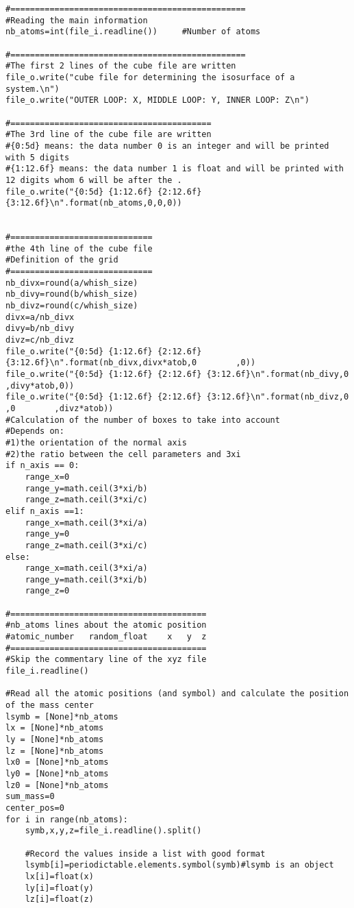 \begin{lstlisting}
#================================================
#Reading the main information
nb_atoms=int(file_i.readline())     #Number of atoms

#================================================
#The first 2 lines of the cube file are written
file_o.write("cube file for determining the isosurface of a system.\n")
file_o.write("OUTER LOOP: X, MIDDLE LOOP: Y, INNER LOOP: Z\n")

#=========================================
#The 3rd line of the cube file are written
#{0:5d} means: the data number 0 is an integer and will be printed with 5 digits
#{1:12.6f} means: the data number 1 is float and will be printed with 12 digits whom 6 will be after the .
file_o.write("{0:5d} {1:12.6f} {2:12.6f} {3:12.6f}\n".format(nb_atoms,0,0,0))


#=============================
#the 4th line of the cube file
#Definition of the grid
#=============================
nb_divx=round(a/whish_size) 
nb_divy=round(b/whish_size) 
nb_divz=round(c/whish_size) 
divx=a/nb_divx
divy=b/nb_divy
divz=c/nb_divz
file_o.write("{0:5d} {1:12.6f} {2:12.6f} {3:12.6f}\n".format(nb_divx,divx*atob,0        ,0))
file_o.write("{0:5d} {1:12.6f} {2:12.6f} {3:12.6f}\n".format(nb_divy,0        ,divy*atob,0))
file_o.write("{0:5d} {1:12.6f} {2:12.6f} {3:12.6f}\n".format(nb_divz,0        ,0        ,divz*atob))
#Calculation of the number of boxes to take into account
#Depends on:
#1)the orientation of the normal axis
#2)the ratio between the cell parameters and 3xi
if n_axis == 0:
	range_x=0
	range_y=math.ceil(3*xi/b)
	range_z=math.ceil(3*xi/c)
elif n_axis ==1:
	range_x=math.ceil(3*xi/a) 
	range_y=0
	range_z=math.ceil(3*xi/c)
else:
	range_x=math.ceil(3*xi/a)
	range_y=math.ceil(3*xi/b)
	range_z=0
	
#========================================
#nb_atoms lines about the atomic position
#atomic_number   random_float    x   y  z
#========================================
#Skip the commentary line of the xyz file
file_i.readline()

#Read all the atomic positions (and symbol) and calculate the position of the mass center
lsymb = [None]*nb_atoms
lx = [None]*nb_atoms
ly = [None]*nb_atoms
lz = [None]*nb_atoms
lx0 = [None]*nb_atoms
ly0 = [None]*nb_atoms
lz0 = [None]*nb_atoms
sum_mass=0
center_pos=0
for i in range(nb_atoms):
	symb,x,y,z=file_i.readline().split()

	#Record the values inside a list with good format
	lsymb[i]=periodictable.elements.symbol(symb)#lsymb is an object
	lx[i]=float(x)
	ly[i]=float(y)
	lz[i]=float(z)
	

\end{lstlisting}
